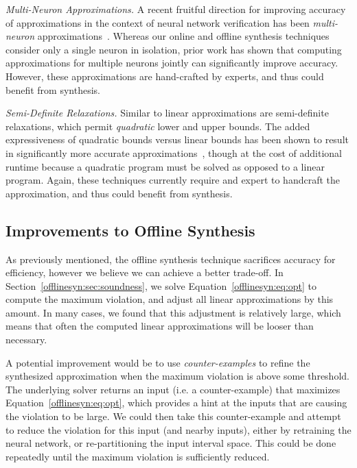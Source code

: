 \textit{Multi-Neuron Approximations.} A recent fruitful direction for
improving accuracy of approximations in the context of neural network
verification has been \textit{multi-neuron}
approximations~\cite{Singh2019krelu,muller2021prima}. Whereas our online
and offline synthesis techniques consider only a single neuron in
isolation, prior work has shown that computing approximations for multiple
neurons jointly can significantly improve accuracy. However, these
approximations are hand-crafted by experts, and thus could benefit from
synthesis.

\textit{Semi-Definite Relaxations.} Similar to linear approximations are
semi-definite relaxations, which permit \textit{quadratic} lower and upper
bounds. The added expressiveness of quadratic bounds versus linear bounds
has been shown to result in significantly more accurate
approximations~\cite{dathathri2020enabling}, though at the cost of
additional runtime because a quadratic program must be solved as opposed to
a linear program. Again, these techniques currently require and expert to
handcraft the approximation, and thus could benefit from synthesis.


\subsection{Improvements to Offline Synthesis}
As previously mentioned, the offline synthesis technique sacrifices accuracy
for efficiency, however we believe we can achieve a better trade-off. In
Section~\ref{offlinesyn:sec:soundness}, we solve
Equation~\ref{offlinesyn:eq:opt} to compute the maximum violation, and
adjust all linear approximations by this amount. In many cases, we found
that this adjustment is relatively large, which means that often the
computed linear approximations will be looser than necessary.

A potential improvement would be to use \textit{counter-examples} to refine
the synthesized approximation when the maximum violation is above some
threshold. The underlying solver returns an input (i.e. a counter-example) that
maximizes Equation~\ref{offlinesyn:eq:opt}, which provides a
hint at the inputs that are causing the violation to be large. We could
then take this counter-example and attempt to reduce the violation for this
input (and nearby inputs), either by retraining the neural network, or
re-partitioning the input interval space. This could be done repeatedly
until the maximum violation is sufficiently reduced.